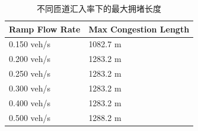 \begin{table}
\caption{不同匝道汇入率下的最大拥堵长度}
\label{tab:congestion}
\begin{tabular}{ll}
\toprule
Ramp Flow Rate & Max Congestion Length \\
\midrule
0.150 veh/s & 1082.7 m \\
0.200 veh/s & 1283.2 m \\
0.250 veh/s & 1283.2 m \\
0.300 veh/s & 1283.2 m \\
0.400 veh/s & 1283.2 m \\
0.500 veh/s & 1288.2 m \\
\bottomrule
\end{tabular}
\end{table}
